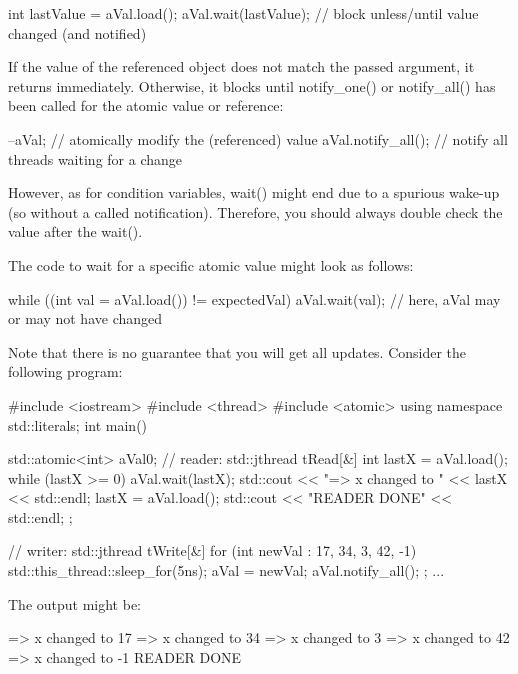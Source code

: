 \begin{cpp}
int lastValue = aVal.load();
aVal.wait(lastValue); // block unless/until value changed (and notified)
\end{cpp}

If the value of the referenced object does not match the passed argument, it returns immediately. Otherwise, it blocks until notify\_one() or notify\_all() has been called for the atomic value or reference:

\begin{cpp}
--aVal; // atomically modify the (referenced) value
aVal.notify_all(); // notify all threads waiting for a change
\end{cpp}

However, as for condition variables, wait() might end due to a spurious wake-up (so without a called notification). Therefore, you should always double check the value after the wait().

The code to wait for a specific atomic value might look as follows:

\begin{cpp}
while ((int val = aVal.load()) != expectedVal) {
	aVal.wait(val);
	// here, aVal may or may not have changed
}
\end{cpp}

Note that there is no guarantee that you will get all updates. Consider the following program:


\begin{cpp}
#include <iostream>
#include <thread>
#include <atomic>
using namespace std::literals;
int main()
{
	std::atomic<int> aVal{0};
	// reader:
	std::jthread tRead{[&] {
						int lastX = aVal.load();
						while (lastX >= 0) {
							aVal.wait(lastX);
							std::cout << "=> x changed to " << lastX << std::endl;
							lastX = aVal.load();
						}
						std::cout << "READER DONE" << std::endl;
				}};

	// writer:
	std::jthread tWrite{[&] {
						for (int newVal : { 17, 34, 3, 42, -1}) {
							std::this_thread::sleep_for(5ns);
							aVal = newVal;
							aVal.notify_all();
						}
				}};
	...
}
\end{cpp}

The output might be:

\begin{shell}
=> x changed to 17
=> x changed to 34
=> x changed to 3
=> x changed to 42
=> x changed to -1
READER DONE
\end{shell}

